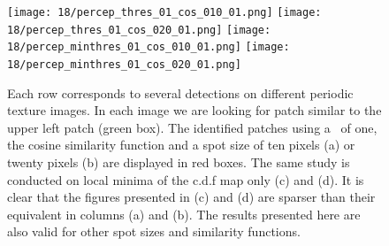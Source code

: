 \captionsetup[subfigure]{labelformat=parens}
\begin{figure}[H]
  \centering
  {\texttt{[image: 18/percep\_thres\_01\_cos\_010\_01.png]}} \hfill
  {\texttt{[image: 18/percep\_thres\_01\_cos\_020\_01.png]}} \hfill
  {\texttt{[image: 18/percep\_minthres\_01\_cos\_010\_01.png]}} \hfill
  {\texttt{[image: 18/percep\_minthres\_01\_cos\_020\_01.png]}} \hfill \\
   \hfill
   \hfill
   \hfill
   \hfill  
  \caption{Each row corresponds to several detections on different periodic texture images. In each image we are looking for patch similar to the upper left patch (green box). The identified patches using a \NFA \ of one, the cosine similarity function and a spot size of ten pixels (a) or twenty pixels (b) are displayed in red boxes. The same study is conducted on local minima of the c.d.f map only (c) and (d). It is clear that the figures presented in (c) and (d) are sparser than their equivalent in columns (a) and (b). The results presented here are also valid for other spot sizes and similarity functions.}
  \label{f:minima_justif}
\end{figure}
\captionsetup[subfigure]{labelformat=empty}
